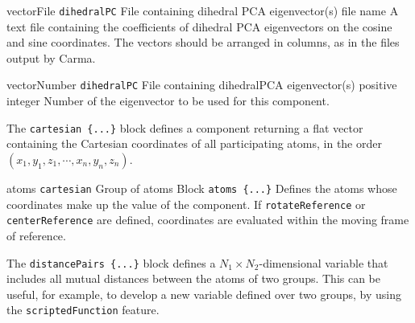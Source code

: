 {\begin{cvcoptions}

\item %

\item %

\item %
  \key
    {vectorFile}{%
    \texttt{dihedralPC}}{%
    File containing dihedral PCA eigenvector(s)}{%
    file name}{%
    A text file containing the coefficients of dihedral PCA eigenvectors on the
    cosine and sine coordinates. The vectors should be arranged in columns,
    as in the files output by Carma.\cite{Glykos2006}}

\item %
  \key
    {vectorNumber}{%
    \texttt{dihedralPC}}{%
    File containing dihedralPCA eigenvector(s)}{%
    positive integer}{%
    Number of the eigenvector to be used for this component.}
\end{cvcoptions}

} %




The \texttt{cartesian~\{...\}} block defines a component returning a flat vector containing
the Cartesian coordinates of all participating atoms, in the order
$(x_1, y_1, z_1, \cdots, x_n, y_n, z_n)$.

\begin{cvcoptions}
\item %
  \key
    {atoms}{%
    \texttt{cartesian}}{%
    Group of atoms}{%
    Block \texttt{atoms \{...\}}}{%
    Defines the atoms whose coordinates make up the value of the component.
    If \texttt{rotateReference} or \texttt{centerReference} are defined, coordinates
    are evaluated within the moving frame of reference.}
\end{cvcoptions}



The \texttt{distancePairs~\{...\}} block defines a $N_{\mathrm{1}}\times{}N_{\mathrm{2}}$-dimensional variable that includes all mutual distances between the atoms of two groups.
This can be useful, for example, to develop a new variable defined over two groups, by using the \texttt{scriptedFunction} feature.

